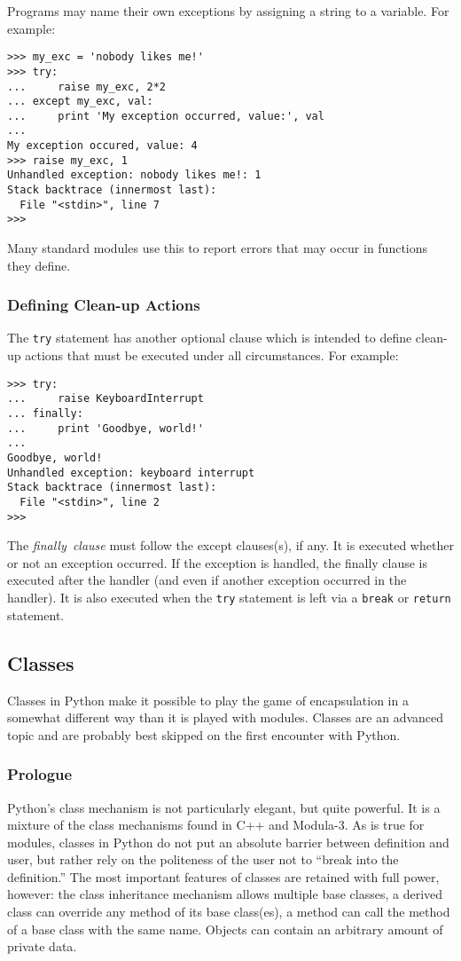 Programs may name their own exceptions by assigning a string to a
variable.
For example:
\bcode\begin{verbatim}
>>> my_exc = 'nobody likes me!'
>>> try:
...     raise my_exc, 2*2
... except my_exc, val:
...     print 'My exception occurred, value:', val
... 
My exception occured, value: 4
>>> raise my_exc, 1
Unhandled exception: nobody likes me!: 1
Stack backtrace (innermost last):
  File "<stdin>", line 7
>>> 
\end{verbatim}\ecode
Many standard modules use this to report errors that may occur in
functions they define.

\subsubsection{Defining Clean-up Actions}

The {\tt try} statement has another optional clause which is intended to
define clean-up actions that must be executed under all circumstances.
For example:
\bcode\begin{verbatim}
>>> try:
...     raise KeyboardInterrupt
... finally:
...     print 'Goodbye, world!'
... 
Goodbye, world!
Unhandled exception: keyboard interrupt
Stack backtrace (innermost last):
  File "<stdin>", line 2
>>> 
\end{verbatim}\ecode
The
{\em finally\ clause}
must follow the except clauses(s), if any.
It is executed whether or not an exception occurred.
If the exception is handled, the finally clause is executed after the
handler (and even if another exception occurred in the handler).
It is also executed when the {\tt try} statement is left via a
{\tt break} or {\tt return} statement.

\subsection{Classes}

Classes in Python make it possible to play the game of encapsulation in a
somewhat different way than it is played with modules.
Classes are an advanced topic and are probably best skipped on the first
encounter with Python.

\subsubsection{Prologue}

Python's class mechanism is not particularly elegant, but quite powerful.
It is a mixture of the class mechanisms found in C++ and Modula-3.
As is true for modules, classes in Python do not put an absolute barrier
between definition and user, but rather rely on the politeness of the
user not to ``break into the definition.''
The most important features of classes are retained with full power,
however: the class inheritance mechanism allows multiple base classes,
a derived class can override any method of its base class(es), a method
can call the method of a base class with the same name.
Objects can contain an arbitrary amount of private data.

